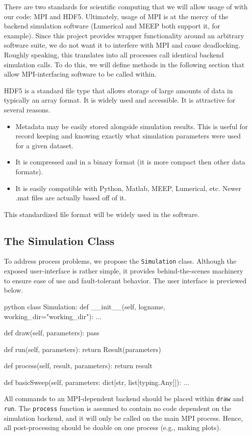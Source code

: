 \documentclass[12pt]{article}
\begin{document}
There are two standards for scientific computing that we will allow usage of with our code: MPI and HDF5. Ultimately, usage of MPI is at the mercy of the backend simulation software (Lumerical and MEEP both support it, for example). Since this project provides wrapper functionality around an arbitrary software suite, we do not want it to interfere with MPI and cause deadlocking. Roughly speaking, this translates into all processes call identical backend simulation calls. To do this, we will define methods in the following section that allow MPI-interfacing software to be called within. 

HDF5 is a standard file type that allows storage of large amounts of data in typically an array format. It is widely used and accessible. It is attractive for several reasons.
\begin{itemize}
\item Metadata may be easily stored alongside simulation results. This is useful for record keeping and knowing exactly what simulation parameters were used for a given dataset. 
\item It is compressed and in a binary format (it is more compact then other data formats).
\item It is easily compatible with Python, Matlab, MEEP, Lumerical, etc. Newer .mat files are actually based off of it.
\end{itemize}
This standardized file format will be widely used in the software.

\subsection{The Simulation Class}
To address process problems, we propose the \texttt{Simulation} class. Although the exposed user-interface is rather simple, it provides behind-the-scenes machinery to ensure ease of use and fault-tolerant behavior. The user interface is previewed below. 
\begin{mintedbox}{python}
class Simulation:
	def __init__(self, logname, working_dir="working_dir"):
	    ...

    def draw(self, parameters):
        pass
    
    def run(self, parameters):
        return Result(parameters)
    
    def process(self, result, parameters):
        return result
        
    def basicSweep(self, parameters: dict[str, list[typing.Any]]):
    	...
\end{mintedbox}
All commands to an MPI-dependent backend should be placed within \texttt{draw} and \texttt{run}. The \texttt{process} function is assumed to contain no code dependent on the simulation backend, and it will only be called on the main MPI process. Hence, all post-processing should be doable on one process (e.g., making plots). 
\end{document}
